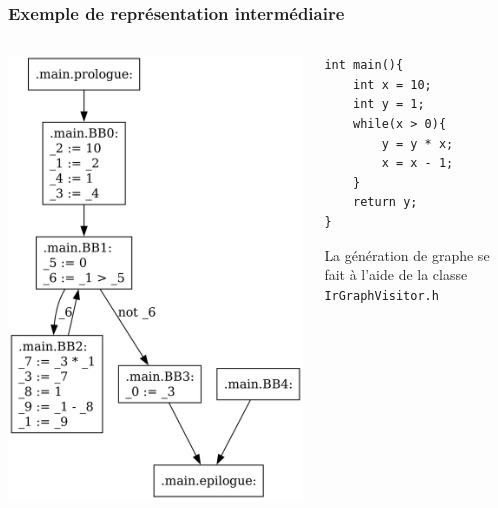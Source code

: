 \documentclass{beamer}
\begin{document}
\begin{frame}[fragile]
    \frametitle{Exemple de représentation intermédiaire}

    \begin{columns}
        \begin{column}{.5\textwidth}
            \begin{center}
                \includegraphics[width=\textwidth,height=0.8\textheight,keepaspectratio]{graphs/fact_no_opti.dot.png}
            \end{center}
        \end{column}
        \begin{column}{.5\textwidth}
            \begin{lstlisting}
int main(){
    int x = 10;
    int y = 1;
    while(x > 0){
        y = y * x;
        x = x - 1;
    }
    return y;
}
            \end{lstlisting}
            La génération de graphe se fait à l'aide de la classe \lstinline{IrGraphVisitor.h}
        \end{column}
    \end{columns}

\end{frame}
\end{document}
